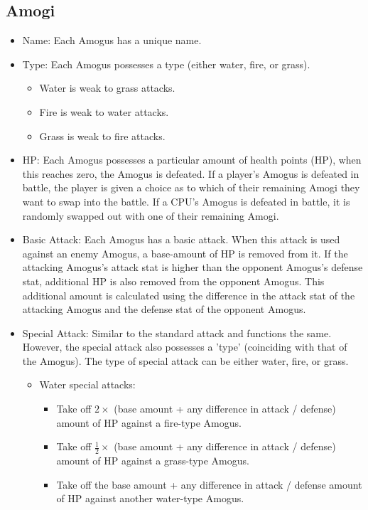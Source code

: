 \documentclass{article}
\begin{document}
  \subsection{Amogi}
  \begin{itemize}
    \item Name: Each Amogus has a unique name. 
    \item Type: Each Amogus possesses a type (either water, fire, or grass).
      \begin{itemize}
        \item Water is weak to grass attacks. 
        \item Fire is weak to water attacks. 
        \item Grass is weak to fire attacks. 
      \end{itemize}
    \item HP: Each Amogus possesses a particular amount of health points (HP), when this reaches zero, the Amogus is defeated. If a player's Amogus is defeated in battle, the player is given a choice as to which of their remaining Amogi they want to swap into the battle. If a CPU's Amogus is defeated in battle, it is randomly swapped out with one of their remaining Amogi. 
    \item Basic Attack: Each Amogus has a basic attack. When this attack is used against an enemy Amogus, a base-amount of HP is removed from it. If the attacking Amogus's attack stat is higher than the opponent Amogus's defense stat, additional HP is also removed from the opponent Amogus. This additional amount is calculated using the difference in the attack stat of the attacking Amogus and the defense stat of the opponent Amogus. 
    \item Special Attack: Similar to the standard attack and functions the same. However, the special attack also possesses a 'type' (coinciding with that of the Amogus). The type of special attack can be either water, fire, or grass. 
      \begin{itemize}
        \item Water special attacks:
          \begin{itemize}
            \item Take off $2\times$ (base amount + any difference in attack / defense) amount of HP against a fire-type Amogus.
            \item Take off $\frac{1}{2}\times{}$ (base amount + any difference in attack / defense) amount of HP against a grass-type Amogus.
            \item Take off the base amount + any difference in attack / defense amount of HP against another water-type Amogus.

\end{itemize}
\end{itemize}
\end{itemize}
\end{document}
